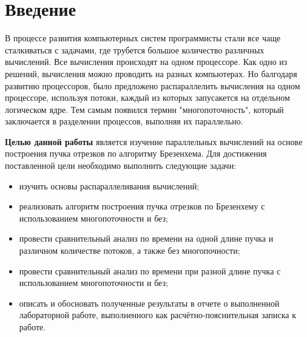 \chapter*{Введение}


В процессе развития компьютерных систем программисты стали все чаще сталкиваться с задачами, где трубется большое количество различных вычислений. Все вычисления происходят на одном процессоре. Как одно из решений, вычисления можно проводить на разных компьютерах. Но балгодаря развитию процессоров, было предложено распараллелить вычисления на одном процессоре, используя потоки, каждый из которых запусакется на отдельном логическом ядре. Тем самым появился термин "многопоточность", который заключается в разделении процессов, выполняя их параллельно. \newline


\textbf{Целью данной работы} является изучение параллельных вычислений на основе построения пучка отрезков по алгоритму Брезенхема. 
Для достижения поставленной цели необходимо выполнить следующие задачи:
\begin{itemize}
	\item изучить основы распараллеливания вычислений;
    \item реализовать алгоритм построения пучка отрезков по Брезенхему с использованием многопоточности и без;
    \item провести сравнительный анализ по времени на одной длине пучка и различном количестве потоков, а также без многопочности;
    \item провести сравнительный анализ по времени при разной длине пучка с использованием многопоточности и без;
	\item описать и обосновать полученные результаты в отчете о выполненной лабораторной работе, выполненного как расчётно-пояснительная записка к работе.
\end{itemize}
